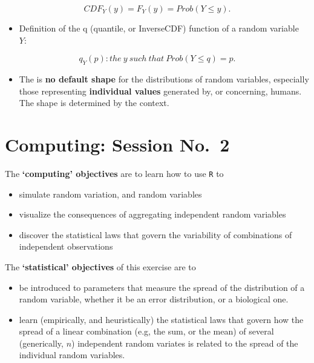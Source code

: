 \documentclass[]{book}
\providecommand{\tightlist}{%
  \setlength{\itemsep}{0pt}\setlength{\parskip}{0pt}}
\begin{document}
\[CDF_Y(y) = F_Y(y) =  Prob( Y \le y).\]

\begin{itemize}
\tightlist
\item
  Definition of the q (quantile, or InverseCDF) function of a random variable \(Y:\)
\end{itemize}

\[ q_Y(p) : the \ y \ such \ that \ Prob( Y \le q) = p.\]

\begin{itemize}
\tightlist
\item
  The is \textbf{no default shape} for the distributions of random variables, especially those representing \textbf{individual values} generated by, or concerning, humans. The shape is determined by the context.
\end{itemize}

\hypertarget{computing02}{%
\chapter{Computing: Session No.~2}\label{computing02}}

The \textbf{`computing' objectives} are to learn how to use \texttt{R} to

\begin{itemize}
\item
  simulate random variation, and random variables
\item
  visualize the consequences of aggregating independent random variables\\
\item
  discover the statistical laws that govern the variability of combinations of independent observations
\end{itemize}

The \textbf{`statistical' objectives} of this exercise are to

\begin{itemize}
\item
  be introduced to parameters that measure the spread of the distribution of a random variable, whether it be an error distribution, or a biological one.
\item
  learn (empirically, and heuristically) the statistical laws that govern how the spread of a linear combination (e.g, the sum, or the mean) of several (generically, \(n\)) independent random variates is related to the spread of the individual random variables.
\end{itemize}
\end{document}
